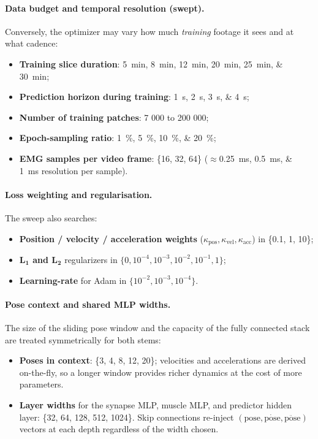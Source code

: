 \paragraph{Data budget and temporal resolution (swept).}
Conversely, the optimizer may vary how much \emph{training} footage it sees and
at what cadence:

\begin{itemize}
  \item \textbf{Training slice duration}: \SIlist{5;8;12;20;25;30}{min};
  \item \textbf{Prediction horizon during training}: \SIlist{1;2;3;4}{s};
  \item \textbf{Number of training patches}: 7 000 to 200 000;
  \item \textbf{Epoch-sampling ratio}: \SIlist{1;5;10;20}{\%};
  \item \textbf{EMG samples per video frame}: \{16, 32, 64\}
        (\(\approx\)\SIlist{0.25;0.5;1}{ms} resolution per sample).
\end{itemize}

\paragraph{Loss weighting and regularisation.}
The sweep also searches:

\begin{itemize}
  \item \textbf{Position / velocity / acceleration weights}
        (\(\kappa_{\text{pos}},\kappa_{\text{vel}},\kappa_{\text{acc}}\))
        in \{0.1, 1, 10\};
  \item \textbf{L\(_\mathbf{1}\) and L\(_\mathbf{2}\)} regularizers in
        \(\{0,10^{-4},10^{-3},10^{-2},10^{-1},1\}\);
  \item \textbf{Learning-rate} for Adam in \(\{10^{-2},10^{-3},10^{-4}\}\).
\end{itemize}

\paragraph{Pose context and shared MLP widths.}
The size of the sliding pose window and the capacity of the fully connected
stack are treated symmetrically for both stems:

\begin{itemize}
  \item \textbf{Poses in context}: \{3, 4, 8, 12, 20\};
        velocities and accelerations are derived on-the-fly, so a longer
        window provides richer dynamics at the cost of more parameters.
  \item \textbf{Layer widths} for the synapse MLP, muscle MLP, and predictor
        hidden layer: \{32, 64, 128, 512, 1024\}.
        Skip connections re-inject \((\text{pose},\dot{\text{pose}},
        \ddot{\text{pose}})\) vectors at each depth regardless of the width
        chosen.
\end{itemize}


